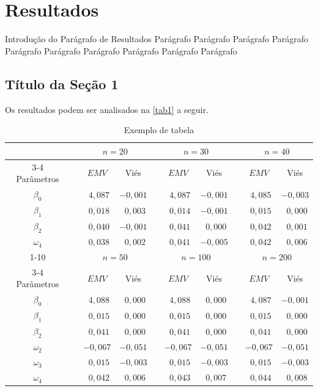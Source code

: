 

\chapter{Resultados}\label{cap_resultados}

Introdução do Parágrafo de Resultados Parágrafo Parágrafo Parágrafo Parágrafo Parágrafo Parágrafo Parágrafo Parágrafo Parágrafo Parágrafo 

\section{Título da Seção 1}



Os resultados podem ser analisados na \autoref{tab1} a seguir.

\begin{table}[!htp]
\centering
\caption{Exemplo de tabela}\label{tab1}
\medskip
\begin{tabular}{cccccccccc}\toprule 
&&\multicolumn{2}{c}{$n=20$}&&\multicolumn{2}{c}{$n=30$}&&\multicolumn{2}{c}{$n=40$}  \\
\cmidrule{3-4}\cmidrule{6-7}\cmidrule{9-10}
Parâmetros && $EMV$ & Viés && $EMV$ & Viés && $EMV$ & Viés \\   \midrule
$\beta_0$  && $\ \ 4,087 $ & $   -0,001 $ && $\ \ 4,087 $ & $   -0,001$ && $\ \ 4,085 $ & $   -0,003 $ \\
$\beta_1$  && $\ \ 0,018 $ & $\ \ 0,003 $ && $\ \ 0,014 $ & $   -0,001$ && $\ \ 0,015 $ & $\ \ 0,000 $ \\
$\beta_2$  && $\ \ 0,040 $ & $   -0,001 $ && $\ \ 0,041 $ & $\ \ 0,000$ && $\ \ 0,042 $ & $\ \ 0,001 $ \\
$\omega_4$ && $\ \ 0,038 $ & $\ \ 0,002 $ && $\ \ 0,041 $ & $   -0,005$ && $\ \ 0,042 $ & $\ \ 0,006 $ \\
   \cmidrule{1-10} 
&&\multicolumn{2}{c}{$n=50$}&&\multicolumn{2}{c}{$n=100$}&&\multicolumn{2}{c}{$n=200$}  \\
\cmidrule{3-4}\cmidrule{6-7}\cmidrule{9-10}
Parâmetros && $EMV$ & Viés && $EMV$ & Viés && $EMV$ & Viés \\   \midrule
$\beta_0$  && $\ \ 4,088 $ & $\ \ 0,000 $ && $\ \ 4,088 $ & $\ \ 0,000 $ && $\ \  4,087 $ & $   -0,001 $ \\
$\beta_1$  && $\ \ 0,015 $ & $\ \ 0,000 $ && $\ \ 0,015 $ & $\ \ 0,000 $ && $\ \  0,015 $ & $\ \ 0,000 $ \\
$\beta_2$  && $\ \ 0,041 $ & $\ \ 0,000 $ && $\ \ 0,041 $ & $\ \ 0,000 $ && $\ \  0,041 $ & $\ \ 0,000 $ \\
$\omega_2$ && $   -0,067 $ & $   -0,051 $ && $   -0,067 $ & $   -0,051 $ && $    -0,067 $ & $   -0,051 $ \\
$\omega_3$ && $\ \ 0,015 $ & $   -0,003 $ && $\ \ 0,015 $ & $   -0,003 $ && $\ \  0,015 $ & $   -0,003 $ \\
$\omega_4$ && $\ \ 0,042 $ & $\ \ 0,006 $ && $\ \ 0,043 $ & $\ \ 0,007 $ && $\ \  0,044 $ & $\ \ 0,008 $ \\
      \midrule 
\end{tabular}
\end{table}




